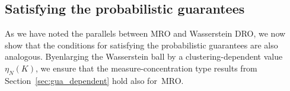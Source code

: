 {\subsection{Satisfying the probabilistic guarantees}
\label{par:gau}
As we have noted the parallels between \gls{MRO} and Wasserstein \gls{DRO}, we now show that the conditions for satisfying the probabilistic guarantees are also analogous. Byenlarging the Wasserstein ball by a clustering-dependent value $\eta_N(K)$, we ensure that the measure-concentration type results from Section~\ref{sec:gua_dependent} hold also for~\gls{MRO}.
}
